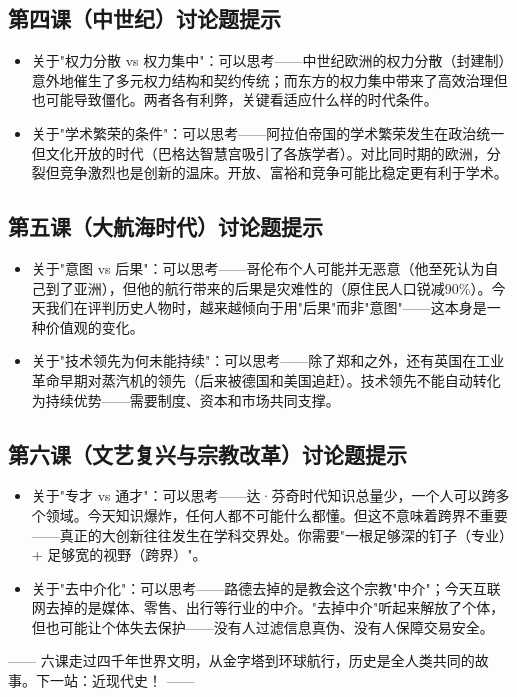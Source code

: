 \documentclass[a4paper,12pt]{ctexart}
\begin{document}
\subsection*{第四课（中世纪）讨论题提示}
\begin{itemize}
  \item 关于"权力分散 vs 权力集中"：可以思考——中世纪欧洲的权力分散（封建制）意外地催生了多元权力结构和契约传统；而东方的权力集中带来了高效治理但也可能导致僵化。两者各有利弊，关键看适应什么样的时代条件。
  \item 关于"学术繁荣的条件"：可以思考——阿拉伯帝国的学术繁荣发生在政治统一但文化开放的时代（巴格达智慧宫吸引了各族学者）。对比同时期的欧洲，分裂但竞争激烈也是创新的温床。开放、富裕和竞争可能比稳定更有利于学术。
\end{itemize}

\subsection*{第五课（大航海时代）讨论题提示}
\begin{itemize}
  \item 关于"意图 vs 后果"：可以思考——哥伦布个人可能并无恶意（他至死认为自己到了亚洲），但他的航行带来的后果是灾难性的（原住民人口锐减90\%）。今天我们在评判历史人物时，越来越倾向于用"后果"而非"意图"——这本身是一种价值观的变化。
  \item 关于"技术领先为何未能持续"：可以思考——除了郑和之外，还有英国在工业革命早期对蒸汽机的领先（后来被德国和美国追赶）。技术领先不能自动转化为持续优势——需要制度、资本和市场共同支撑。
\end{itemize}

\subsection*{第六课（文艺复兴与宗教改革）讨论题提示}
\begin{itemize}
  \item 关于"专才 vs 通才"：可以思考——达·芬奇时代知识总量少，一个人可以跨多个领域。今天知识爆炸，任何人都不可能什么都懂。但这不意味着跨界不重要——真正的大创新往往发生在学科交界处。你需要"一根足够深的钉子（专业）+ 足够宽的视野（跨界）"。
  \item 关于"去中介化"：可以思考——路德去掉的是教会这个宗教"中介"；今天互联网去掉的是媒体、零售、出行等行业的中介。"去掉中介"听起来解放了个体，但也可能让个体失去保护——没有人过滤信息真伪、没有人保障交易安全。
\end{itemize}

\vspace{0.5cm}
\begin{center}
\textcolor{blue!70!black}{\large —— 六课走过四千年世界文明，从金字塔到环球航行，历史是全人类共同的故事。下一站：近现代史！ ——}
\end{center}
\end{document}

